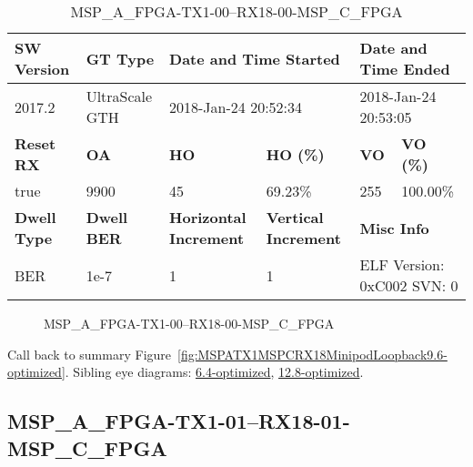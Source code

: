 \begin{table}[h]
\centering
\caption{MSP\_A\_FPGA-TX1-00--RX18-00-MSP\_C\_FPGA}
\label{tab:MSPAFPGATX100RX1800MSPCFPGA9.6-optimized}
\begin{tabular}{@{}|l|l|l|l|l|l|@{}}
\toprule
\textbf{SW Version}                & \textbf{GT Type}   & \multicolumn{2}{l|}{\textbf{Date and Time Started}}            & \multicolumn{2}{l|}{\textbf{Date and Time Ended}}        \\ \midrule
2017.2                       & UltraScale GTH          & \multicolumn{2}{l|}{2018-Jan-24 20:52:34}                   & \multicolumn{2}{l|}{2018-Jan-24 20:53:05}               \\ \midrule
\textbf{Reset RX}                  & \textbf{OA} & \textbf{HO}   & \textbf{HO (\%)} & \textbf{VO} & \textbf{VO (\%)} \\ \midrule
true & 9900        & 45          & 69.23\%        & 255        & 100.00\%       \\ \midrule
\textbf{Dwell Type}                & \textbf{Dwell BER} & \textbf{Horizontal Increment} & \textbf{Vertical Increment}    & \multicolumn{2}{l|}{\textbf{Misc Info}}                  \\ \midrule
BER                            & 1e-7        & 1        & 1           & \multicolumn{2}{l|}{ELF Version: 0xC002 SVN: 0}                         \\ \bottomrule
\end{tabular}
\end{table}

\begin{figure}[h]
\caption{MSP\_A\_FPGA-TX1-00--RX18-00-MSP\_C\_FPGA} \label{fig:MSPAFPGATX100RX1800MSPCFPGA9.6-optimized}
\end{figure}

Call back to summary Figure~\ref{fig:MSPATX1MSPCRX18MinipodLoopback9.6-optimized}.
Sibling eye diagrams: \hyperref[sec:MSPAFPGATX100RX1800MSPCFPGA6.4-optimized]{6.4-optimized}, \hyperref[sec:MSPAFPGATX100RX1800MSPCFPGA12.8-optimized]{12.8-optimized}.

\clearpage
\newpage


\subsection{MSP\_A\_FPGA-TX1-01--RX18-01-MSP\_C\_FPGA}\label{sec:MSPAFPGATX101RX1801MSPCFPGA9.6-optimized}

